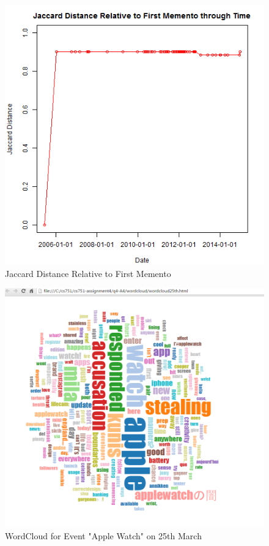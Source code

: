 \documentclass[12pt]{Report}
\begin{document}
\begin{figure}[ht]    
    \begin{center}
        \includegraphics[scale=0.60]{link18.png}
        \caption{Jaccard Distance Relative to First Memento }
        \label{Jaccard Distance Relative to First Memento}
    \end{center}
\end{figure}
\newpage


\begin{figure}[ht]    
    \begin{center}
        \includegraphics[scale=0.60]{word25th.png}
        \caption{WordCloud for Event "Apple Watch" on 25th March }
        \label{WordCloud for Event "Apple Watch" on 25th March}
    \end{center}
\end{figure}
\end{document}
